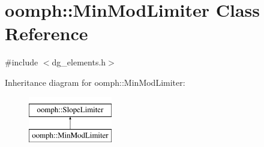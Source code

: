 \hypertarget{classoomph_1_1MinModLimiter}{}\section{oomph\+:\+:Min\+Mod\+Limiter Class Reference}
\label{classoomph_1_1MinModLimiter}


{\ttfamily \#include $<$dg\+\_\+elements.\+h$>$}

Inheritance diagram for oomph\+:\+:Min\+Mod\+Limiter\+:\begin{figure}[H]
\begin{center}
\leavevmode
\includegraphics[height=2.000000cm]{classoomph_1_1MinModLimiter}
\end{center}
\end{figure}
